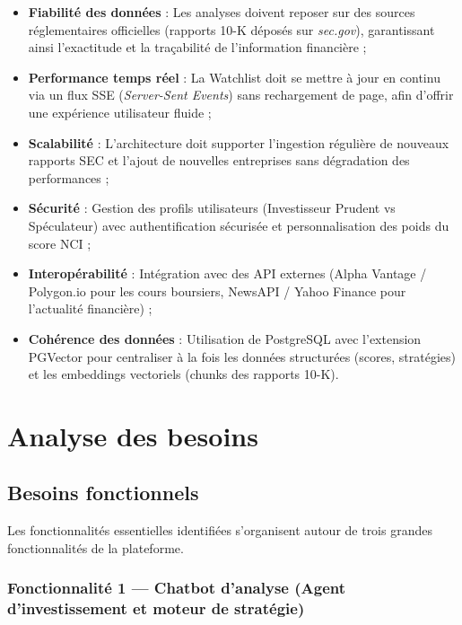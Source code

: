 \begin{itemize}
    \item \textbf{Fiabilité des données} : Les analyses doivent reposer sur des sources
    réglementaires officielles (rapports 10-K déposés sur \textit{sec.gov}), garantissant
    ainsi l'exactitude et la traçabilité de l'information financière ;

    \item \textbf{Performance temps réel} : La Watchlist doit se mettre à jour en continu
    via un flux SSE (\textit{Server-Sent Events}) sans rechargement de page, afin
    d'offrir une expérience utilisateur fluide ;

    \item \textbf{Scalabilité} : L'architecture doit supporter l'ingestion régulière de
    nouveaux rapports SEC et l'ajout de nouvelles entreprises sans dégradation des
    performances ;

    \item \textbf{Sécurité} : Gestion des profils utilisateurs (Investisseur Prudent vs
    Spéculateur) avec authentification sécurisée et personnalisation des poids du score
    NCI ;

    \item \textbf{Interopérabilité} : Intégration avec des API externes (Alpha Vantage /
    Polygon.io pour les cours boursiers, NewsAPI / Yahoo Finance pour l'actualité
    financière) ;

    \item \textbf{Cohérence des données} : Utilisation de PostgreSQL avec l'extension
    PGVector pour centraliser à la fois les données structurées (scores, stratégies) et
    les embeddings vectoriels (chunks des rapports 10-K).
\end{itemize}

\section{Analyse des besoins}

\subsection{Besoins fonctionnels}

Les fonctionnalités essentielles identifiées s'organisent autour de trois grandes 
fonctionnalités de la plateforme.

\subsubsection{Fonctionnalité 1 — Chatbot d’analyse (Agent d’investissement et moteur de stratégie)}

